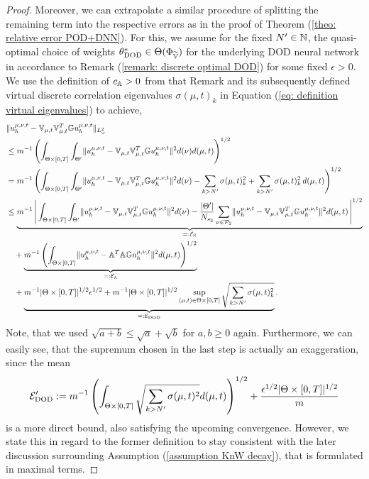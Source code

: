 \begin{proof}
    Moreover, we can extrapolate a similar procedure of splitting the remaining term into the respective errors
    as in the proof of Theorem (\ref{theo: relative error POD+DNN}).
    For this, we assume for the fixed $N' \in \mathbb{N}$, the quasi-optimal choice of weights $\theta_\text{DOD}^* \in
    \Theta(\Phi_{\widetilde{\mathbb{V}}})$ for the underlying DOD neural network in accordance to Remark
    (\ref{remark: discrete optimal DOD}) for some fixed $\epsilon > 0$. We use the definition of
    $c_{\mathbb{A}}>0$ from that Remark and its subsequently defined virtual discrete 
    correlation eigenvalues $\sigma(\mu, t)_k$
    in Equation (\ref{eq: definition virtual eigenvalues}) to achieve,
    \begin{align*}
        &\lVert u_h^{\mu, \nu, t} - \mathbb{V}_{\mu, t} \mathbb{V}_{\mu, t}^T \mathbb{G} u_h^{\mu, \nu, t} \rVert_{L^2_\omega} \\
        &\leq m^{-1} \left( \int_{\Theta \times [0, T]} \int_{\Theta'} 
        \lVert u_h^{\mu, \nu, t} - \mathbb{V}_{\mu, t} \mathbb{V}_{\mu, t}^T \mathbb{G} u_h^{\mu, \nu, t} \rVert^2 d(\nu) d(\mu, t) \right)^{1/2} \\
        &= m^{-1} \left( \int_{\Theta \times [0, T]} \int_{\Theta'} 
        \lVert u_h^{\mu, \nu, t} - \mathbb{V}_{\mu, t} \mathbb{V}_{\mu, t}^T \mathbb{G} u_h^{\mu, \nu, t} \rVert^2 d(\nu) - \sum_{k > N'} \sigma(\mu, t)_k^2 +
        \sum_{k > N'} \sigma(\mu, t)_k^2 \, d(\mu, t) \right)^{1/2} \\
        &\leq \underbrace{m^{-1} \left\vert \, \int_{\Theta \times [0, T]} \int_{\Theta'} 
        \lVert u_h^{\mu, \nu, t} - \mathbb{V}_{\mu, t} \mathbb{V}_{\mu, t}^T 
        \mathbb{G} u_h^{\mu, \nu, t} \rVert^2 d(\nu) -  \frac{\lvert \Theta' \rvert}{N_{s_2}} \sum_{\nu \in \mathcal{P}_2} \lVert u_h^{\mu, \nu, t} - \mathbb{V}_{\mu, t} \mathbb{V}_{\mu, t}^T \mathbb{G} u_h^{\mu, \nu, t} \rVert^2 
        d(\mu, t) \, \right\vert^{1/2}}_{=: \mathcal{E}_\text{S}} \\
        &\quad + \underbrace{m^{-1} \left( \int_{\Theta \times [0, T]} \lVert u_h^{\mu, \nu, t} - \mathbb{A}^T \mathbb{A} \mathbb{G} u_h^{\mu, \nu, t} \rVert^2 d(\mu, t)
        \right)^{1/2}}_{=: \mathcal{E}_{\mathbb{A}}}\\
        &\quad + \underbrace{m^{-1} \lvert \Theta \times [0, T] \rvert^{1/2} \epsilon^{1/2} + m^{-1} \lvert \Theta \times [0, T] \rvert^{1/2}
        \sup\limits_{(\mu, t) \in \Theta \times [0, T]} \sqrt{\sum_{k > N'} \sigma(\mu, t)_k^2}}_{=: \mathcal{E}_\text{DOD}}.
    \end{align*}
    Note, that we used $\sqrt{a + b} \leq \sqrt{a} + \sqrt{b}$ for $a, b \geq 0$ again.
    Furthermore, we can easily see, that the supremum chosen in the last step is actually an exaggeration, since the mean
    \begin{equation*}
        \mathcal{E}'_\text{DOD} := m^{-1} \left( \int_{\Theta \times [0, T]} \sqrt{\sum_{k > N'} \sigma(\mu, t)^2} 
        d(\mu, t) \right)^{1/2} + \frac{\epsilon^{1/2} \lvert \Theta \times [0, T] \rvert^{1/2}}{m}
    \end{equation*} 
    is a more direct bound, also satisfying the upcoming convergence. 
    However, we state this in regard to the former definition to stay consistent
    with the later discussion surrounding Assumption (\ref{assumption KnW decay}), that
    is formulated in maximal terms.


\end{proof}
